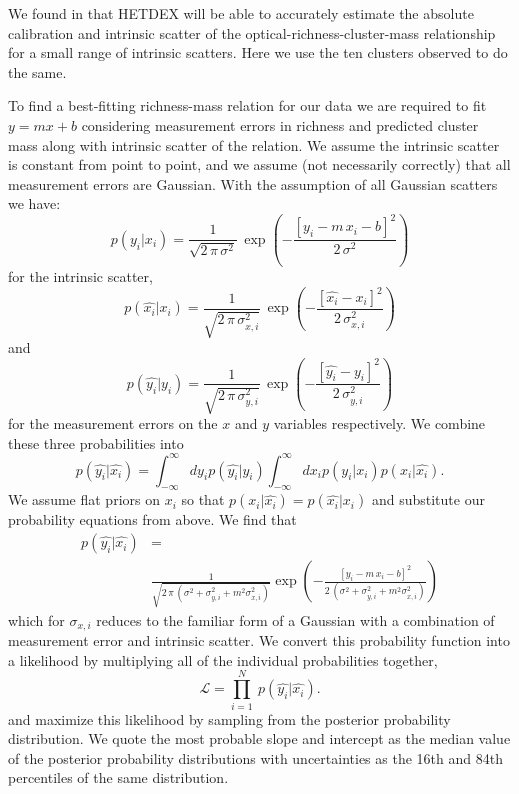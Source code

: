 We found in  that HETDEX will be able to accurately estimate the absolute calibration and intrinsic scatter of the optical-richness-cluster-mass relationship for a small range of intrinsic scatters. Here we use the ten clusters observed to do the same.

To find a best-fitting richness-mass relation for our data we are required to fit $y=mx+b$ considering measurement errors in richness and predicted cluster mass along with intrinsic scatter of the relation. We assume the intrinsic scatter is constant from point to point, and we assume (not necessarily correctly) that all measurement errors are Gaussian. With the assumption of all Gaussian scatters we have:
\begin{equation}\label{eqn:intrinsic scatter}
	p(y_i|x_i) = \frac{1}{\sqrt{2\,\pi\,\sigma^2}}
	 \,\exp\left(-\frac{[y_i - m\,x_i - b]^2}{2\,\sigma^2}\right)
\end{equation}
for the intrinsic scatter,
\begin{equation}\label{eqn:xerr}
	p(\hat{x_i}|x_i) = \frac{1}{\sqrt{2\,\pi\,\sigma_{x,i}^2}}
	 \,\exp\left(-\frac{[\hat{x_i} - x_i]^2}{2\,\sigma_{x,i}^2}\right)
\end{equation}
and
\begin{equation}\label{eqn:yerr}
	p(\hat{y_i}|y_i) = \frac{1}{\sqrt{2\,\pi\,\sigma_{y,i}^2}}
	 \,\exp\left(-\frac{[\hat{y_i} -y_i]^2}{2\,\sigma_{y,i}^2}\right)
\end{equation}
for the measurement errors on the $x$ and $y$ variables respectively. We combine these three probabilities into
\begin{equation}
	p(\hat{y_i}|\hat{x_i}) = \int_{-\infty}^\infty dy_ip(\hat{y_i}|y_i) \int_{-\infty}^\infty dx_ip(y_i|x_i)p(x_i|\hat{x_i}).
\end{equation}
We assume flat priors on $x_i$ so that $p(x_i|\hat{x_i}) = p(\hat{x_i}|x_i)$ and substitute our probability equations from above. We find that
\begin{equation}
	\begin{split}
	p(\hat{y_i}|\hat{x_i}) & = \\ 
	&\frac{1}{\sqrt{2\,\pi\,(\sigma^2 + \sigma_{y,i}^2 + m^2\sigma_{x,i}^2)}}\exp\left(-\frac{[y_i - m\,x_i - b]^2}{2\,(\sigma^2 + \sigma_{y,i}^2 + m^2\sigma_{x,i}^2)}\right)
	\end{split}
\end{equation}
which for $\sigma_{x,i}$ reduces to the familiar form of a Gaussian with a combination of measurement error and intrinsic scatter. We convert this probability function into a likelihood by multiplying all of the individual probabilities together,  
\begin{equation}\label{eq:like}
\mathscr{L} = \prod_{i=1}^N \ p(\hat{y_i}|\hat{x_i}).
\end{equation}
and maximize this likelihood by sampling from the posterior probability distribution. We quote the most probable slope and intercept as the median value of the posterior probability distributions with uncertainties as the 16th and 84th percentiles of the same distribution.

